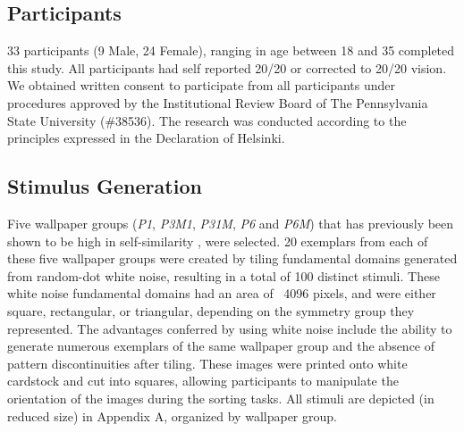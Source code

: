 \documentclass[11pt, twoside]{article}
\begin{document}
\subsection*{Participants}
33 participants (9 Male, 24 Female), ranging in age between 18 and 35 completed this study. All participants had self reported 20/20 or corrected to 20/20 vision. We obtained written consent to participate from all participants under procedures approved by the Institutional Review Board of The Pennsylvania State University (\#38536). The research was conducted according to the principles expressed in the Declaration of Helsinki.

\subsection*{Stimulus Generation}
Five wallpaper groups (\textit{P1}, \textit{P3M1}, \textit{P31M}, \textit{P6} and \textit{P6M}) that has previously been shown to be high in self-similarity \citep{RN172}, were selected. 20 exemplars from each of these five wallpaper groups were created by tiling fundamental domains generated from random-dot white noise, resulting in a total of 100 distinct stimuli. These white noise fundamental domains had an area of ~4096 pixels, and were either square, rectangular, or triangular, depending on the symmetry group they represented. The advantages conferred by using white noise include the ability to generate numerous exemplars of the same wallpaper group and the absence of pattern discontinuities after tiling. These images were printed onto white cardstock and cut into squares, allowing participants to manipulate the orientation of the images during the sorting tasks. All stimuli are depicted (in reduced size) in Appendix A, organized by wallpaper group. 
\end{document}
